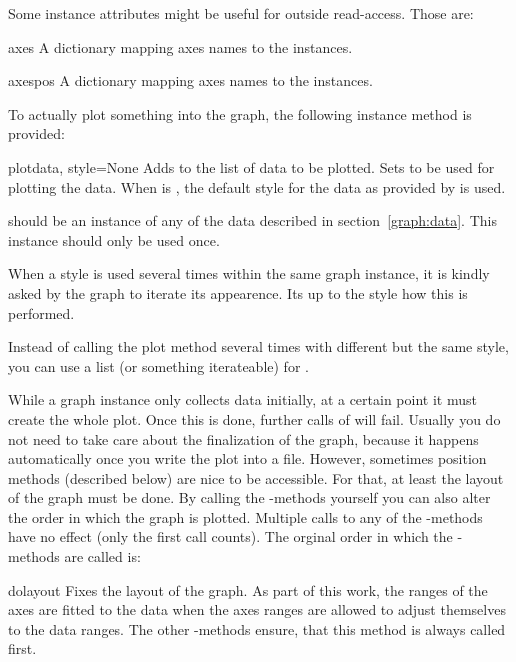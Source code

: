 Some instance attributes might be useful for outside read-access.
Those are:

\begin{memberdesc}{axes}
  A dictionary mapping axes names to the  instances.
\end{memberdesc}

\begin{memberdesc}{axespos}
  A dictionary mapping axes names to the  instances.
\end{memberdesc}

To actually plot something into the graph, the following instance
method  is provided:

\begin{methoddesc}{plot}{data, style=None}
  Adds  to the list of data to be plotted. Sets 
  to be used for plotting the data. When  is ,
  the default style for the data as provided by  is used.

   should be an instance of any of the data described in
  section~\ref{graph:data}. This instance should only be used once.

  When a style is used several times within the same graph instance,
  it is kindly asked by the graph to iterate its appearence. Its up
  to the style how this is performed.

  Instead of calling the plot method several times with different
   but the same style, you can use a list (or something
  iterateable) for .
\end{methoddesc}

While a graph instance only collects data initially, at a certain
point it must create the whole plot. Once this is done, further calls
of  will fail. Usually you do not need to take care
about the finalization of the graph, because it happens automatically
once you write the plot into a file. However, sometimes position
methods (described below) are nice to be accessible. For that, at
least the layout of the graph must be done. By calling the
-methods yourself you can also alter the order in which
the graph is plotted. Multiple calls to any of the
-methods have no effect (only the first call counts). The
orginal order in which the -methods are called is:

\begin{methoddesc}{dolayout}{}
  Fixes the layout of the graph. As part of this work, the ranges of
  the axes are fitted to the data when the axes ranges are allowed to
  adjust themselves to the data ranges. The other -methods
  ensure, that this method is always called first.
\end{methoddesc}

